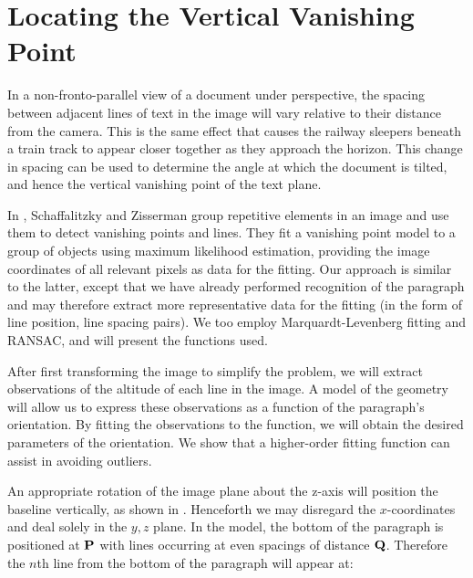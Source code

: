 
\section{Locating the Vertical Vanishing Point} \label{sec-vertvanish}


In a non-fronto-parallel view of a document under perspective, the spacing between adjacent lines of text in the image will vary relative to their distance from the camera.  This is the same effect that causes the railway sleepers beneath a train track to appear closer together as they approach the horizon. This change in spacing can be used to determine the angle at which the document is tilted, and hence the vertical vanishing point of the text plane.

In \cite{planargrouping}, Schaffalitzky and Zisserman group repetitive elements
in an image and use them to detect vanishing points and lines.
They fit a vanishing point model to a group of objects using maximum likelihood estimation,
providing the image coordinates of all relevant pixels as data for the fitting.
Our approach is similar to the latter, except that we have already performed recognition
of the paragraph and may therefore extract more representative data for the fitting
(in the form of line position, line spacing pairs).
We too employ
Marquardt-Levenberg fitting
and RANSAC, and will present the functions used.


After first transforming the image to simplify the problem, we will extract observations of the altitude of each line in the image.  A model of the geometry will allow us to express these observations as a function of the paragraph's orientation.  By fitting the observations to the function, we will obtain the desired parameters of the orientation.  We show that a higher-order fitting function can assist in avoiding outliers.

An appropriate rotation of the image plane about the z-axis will position the baseline vertically, as shown in .  Henceforth we may disregard the $x$-coordinates and deal solely in the $y,z$ plane.
In the model, the bottom of the paragraph is positioned at ${ \bf P }$ with lines occurring at even spacings of distance ${ \bf Q }$.  Therefore the $n$th line from the bottom of the paragraph will appear at:

